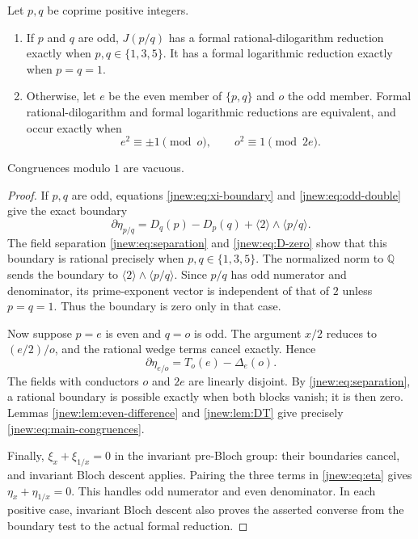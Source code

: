 \begin{theorem}
\label{jnew:thm:classification}
Let $p,q$ be coprime positive integers.
\begin{enumerate}
\item If $p$ and $q$ are odd, $J(p/q)$ has a formal
      rational-dilogarithm reduction exactly when
      $p,q\in\{1,3,5\}$. It has a formal logarithmic reduction
      exactly when $p=q=1$.
\item Otherwise, let $e$ be the even member of $\{p,q\}$ and $o$
      the odd member. Formal rational-dilogarithm and formal logarithmic
      reductions are equivalent, and occur exactly when
\begin{equation}\label{jnew:eq:main-congruences}
 \boxed{\qquad e^2\equiv\pm1\pmod o,
                  \qquad o^2\equiv1\pmod{2e}.\qquad}
\end{equation}
\end{enumerate}
Congruences modulo $1$ are vacuous.
\end{theorem}
\begin{proof}
If $p,q$ are odd, equations \eqref{jnew:eq:xi-boundary} and
\eqref{jnew:eq:odd-double} give the exact boundary
\begin{equation}\label{jnew:eq:odd-boundary}
 \partial\eta_{p/q}
 =D_q(p)-D_p(q)+\langle2\rangle\wedge\langle p/q\rangle.
\end{equation}
The field separation \eqref{jnew:eq:separation} and
\eqref{jnew:eq:D-zero} show that this boundary is rational precisely
when $p,q\in\{1,3,5\}$. The normalized norm to $\mathbb Q$ sends
the boundary to $\langle2\rangle\wedge\langle p/q\rangle$.
Since $p/q$ has odd numerator and denominator, its prime-exponent
vector is independent of that of $2$ unless $p=q=1$. Thus the
boundary is zero only in that case.

Now suppose $p=e$ is even and $q=o$ is odd. The argument $x/2$
reduces to $(e/2)/o$, and the rational wedge terms cancel exactly.
Hence
\begin{equation}\label{jnew:eq:even-boundary}
 \partial\eta_{e/o}=T_o(e)-\Delta_e(o).
\end{equation}
The fields with conductors $o$ and $2e$ are linearly disjoint.
By \eqref{jnew:eq:separation}, a rational boundary is possible
exactly when both blocks vanish; it is then zero. Lemmas
\ref{jnew:lem:even-difference} and \ref{jnew:lem:DT} give precisely
\eqref{jnew:eq:main-congruences}.

Finally, $\xi_x+\xi_{1/x}=0$ in the invariant pre-Bloch group:
their boundaries cancel, and invariant Bloch descent applies.
Pairing the three terms in \eqref{jnew:eq:eta} gives
$\eta_x+\eta_{1/x}=0$. This handles odd numerator and even
denominator. In each positive case, invariant Bloch descent also
proves the asserted converse from the boundary test to the actual
formal reduction.
\end{proof}

